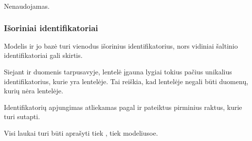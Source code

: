 \documentclass[letterpaper,10pt,lithuanian]{sphinxmanual}
\begin{document}

\begin{fulllineitems}
\label{\detokenize{dimensijos:base.access}}
\pysigstartsignatures
{}
\pysigstopsignatures
\sphinxAtStartPar
Nenaudojamas.

\end{fulllineitems}



\subsubsection{Išoriniai identifikatoriai}
\label{\detokenize{dimensijos:isoriniai-identifikatoriai}}
\sphinxAtStartPar
Modelis ir jo bazė turi vienodus išorinius identifikatorius, nors vidiniai
šaltinio identifikatoriai gali skirtis.

\sphinxAtStartPar
Siejant {\hyperref[\detokenize{formatas:model}]{}} ir {\hyperref[\detokenize{formatas:base}]{}} duomenis tarpusavyje, {\hyperref[\detokenize{formatas:model}]{}}
lentelė įgauna lygiai tokius pačius unikalius identifikatorius, kurie yra
{\hyperref[\detokenize{formatas:base}]{}} lentelėje. Tai reiškia, kad {\hyperref[\detokenize{formatas:model}]{}} lentelėje negali būti
duomenų, kurių nėra {\hyperref[\detokenize{formatas:base}]{}} lentelėje.

\sphinxAtStartPar
Identifikatorių apjungimas atliekamas pagal {\hyperref[\detokenize{dimensijos:model.ref}]{}} ir
{\hyperref[\detokenize{dimensijos:base.ref}]{}} pateiktus pirminius raktus, kurie turi sutapti.

\sphinxAtStartPar
Visi {\hyperref[\detokenize{dimensijos:base.ref}]{}} laukai turi būti aprašyti tiek {\hyperref[\detokenize{formatas:base}]{}}, tiek
{\hyperref[\detokenize{formatas:model}]{}} modeliusoe.
\end{document}
